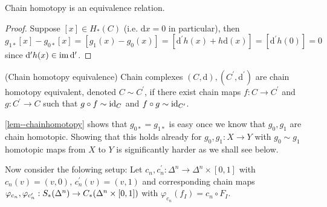 \documentclass[a4paper,11pt]{article}
\begin{document}
			\begin{lemma}\label{lem--chainhomotopy}
				Chain homotopy is an equivalence relation.
			\end{lemma}
			\begin{proof}
				Suppose $[x]\in H_\ast(C)$ (i.e. $\mathrm{d}x=0$ in particular), then $g_{1\ast}[x]-g_{0\ast}[x]=[g_1(x)-g_0(x)]=[\mathrm{d}^{\prime}h(x)+h\mathrm{d}(x)]=[\mathrm{d}^{\prime}h(0)]=0$ since $\mathrm{d}^{\prime}h(x)\in\operatorname{im}\mathrm{d}^{\prime}$.
			\end{proof}

			\begin{defi}(Chain homotopy equivalence)
				Chain complexes $(C,\mathrm{d}),(C^{\prime},\mathrm{d}^{\prime})$ are chain homotopy equivalent, denoted $C\sim C^{\prime}$, if there exist chain maps $f:C\rightarrow C^{\prime}$ and $g:C^{\prime}\rightarrow C$ such that $g\circ f\sim\operatorname{id}_C$ and $f\circ g\sim\operatorname{id}_{C^{\prime}}$. 
			\end{defi}

			\begin{remark}
				\autoref{lem--chainhomotopy} shows that $g_{0\ast}=g_{1\ast}$ is easy once we know that $g_0,g_1$ are chain homotopic. Showing that this holds already for $g_0,g_1:X\rightarrow Y$ with $g_0\sim g_1$ homotopic maps from $X$ to $Y$ is significantly harder as we shall see below.
			\end{remark}

			Now consider the folowing setup: Let $c_n,c^\prime_n:\Delta^n\rightarrow \Delta^n\times[0,1]$ with $c_n(v)=(v,0)$, $c^\prime_n(v)=(v,1)$ and corresponding chain maps $\varphi_{c_n},\varphi_{c^\prime_{n}}:S_\ast(\Delta^n)\rightarrow C_{\ast}(\Delta^n\times[0,1])$ with $\varphi_{c_n}(f_I)=c_n\circ F_I$.
\end{document}
